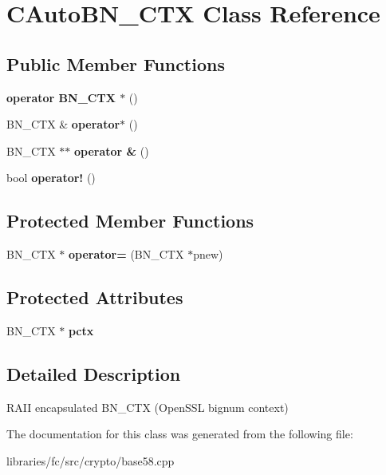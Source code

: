 \hypertarget{class_c_auto_b_n___c_t_x}{}\section{C\+Auto\+B\+N\+\_\+\+C\+TX Class Reference}
\label{class_c_auto_b_n___c_t_x}
\subsection*{Public Member Functions}
\begin{DoxyCompactItemize}
\item 
\mbox{\label{class_c_auto_b_n___c_t_x_a17f28434d1ddfb3133ba34aaa73d44b4}} 
{\bfseries operator B\+N\+\_\+\+C\+T\+X $\ast$} ()
\item 
\mbox{\label{class_c_auto_b_n___c_t_x_a3850675de213c20d764575850a37ddfd}} 
B\+N\+\_\+\+C\+TX \& {\bfseries operator$\ast$} ()
\item 
\mbox{\label{class_c_auto_b_n___c_t_x_a5cb1e357f7d9f6ae1a58d4fe760757ad}} 
B\+N\+\_\+\+C\+TX $\ast$$\ast$ {\bfseries operator \&} ()
\item 
\mbox{\label{class_c_auto_b_n___c_t_x_a33c967d143efcbfafcac9f863fce1d4f}} 
bool {\bfseries operator!} ()
\end{DoxyCompactItemize}
\subsection*{Protected Member Functions}
\begin{DoxyCompactItemize}
\item 
\mbox{\label{class_c_auto_b_n___c_t_x_a954a9a333d2041861500e5cb471fa8f6}} 
B\+N\+\_\+\+C\+TX $\ast$ {\bfseries operator=} (B\+N\+\_\+\+C\+TX $\ast$pnew)
\end{DoxyCompactItemize}
\subsection*{Protected Attributes}
\begin{DoxyCompactItemize}
\item 
\mbox{\label{class_c_auto_b_n___c_t_x_a264ef42b71cb55111928fce1aa4d9ad3}} 
B\+N\+\_\+\+C\+TX $\ast$ {\bfseries pctx}
\end{DoxyCompactItemize}


\subsection{Detailed Description}
R\+A\+II encapsulated B\+N\+\_\+\+C\+TX (Open\+S\+SL bignum context) 

The documentation for this class was generated from the following file\+:\begin{DoxyCompactItemize}
\item 
libraries/fc/src/crypto/base58.\+cpp\end{DoxyCompactItemize}

